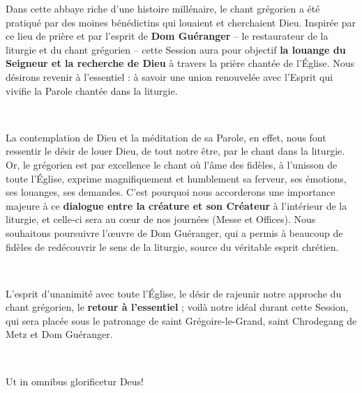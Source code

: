 \documentclass[10pt, twoside, french]{book}
\begin{document}
\thispagestyle{empty}
\null\newpage

\thispagestyle{empty}
\null\newpage


\vspace{5mm}


\vspace{5mm}

Dans cette abbaye riche d’une histoire millénaire, le chant grégorien a été pratiqué par des moines bénédictins qui louaient et cherchaient Dieu. Inspirée par ce lieu de prière et par l’esprit de \textbf{Dom Guéranger} – le restaurateur de la liturgie et du chant grégorien – cette Session aura pour objectif \textbf{la louange du Seigneur et la recherche de Dieu} à travers la prière chantée de l’Église. Nous désirons revenir à l’essentiel : à savoir une union renouvelée avec l’Esprit qui vivifie la Parole chantée dans la liturgie.

~


La contemplation de Dieu et la méditation de sa Parole, en effet, nous font ressentir le désir de louer Dieu, de tout notre être, par le chant dans la liturgie. Or, le grégorien est par excellence le chant où l’âme des fidèles, à l’unisson de toute l’Église, exprime magnifiquement et humblement sa ferveur, ses émotions, ses louanges, ses demandes. C’est pourquoi nous accorderons une importance majeure à ce \textbf{dialogue entre la créature et son Créateur} à l’intérieur de la liturgie, et celle-ci sera au cœur de nos journées (Messe et Offices). Nous souhaitons poursuivre l’œuvre de Dom Guéranger, qui a permis à beaucoup de fidèles de redécouvrir le sens de la liturgie, source du véritable esprit chrétien.

~

L’esprit d’unanimité avec toute l’Église, le désir de rajeunir notre approche du chant grégorien, le \textbf{retour à l’essentiel} ; voilà notre idéal durant cette Session, qui sera placée sous le patronage de saint Grégoire-le-Grand, saint Chrodegang de Metz et Dom Guéranger.

~


\hfill Ut in omnibus glorificetur Deus!

\newpage

\vspace*{4cm}
\end{document}
